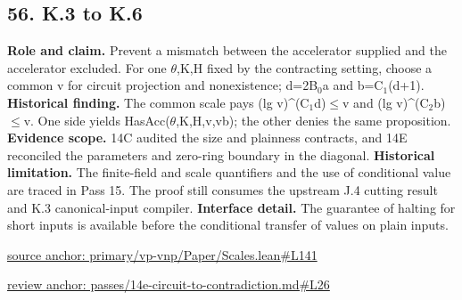\documentclass[11pt,letterpaper]{article}
\theoremstyle{definition}\newtheorem{definition}[theorem]{Definition}\newtheorem{example}[theorem]{Example}
\theoremstyle{remark}\newtheorem{remark}[theorem]{Remark}
\begin{document}
\subsection*{56. K.3 to K.6}
\textbf{Role and claim.} Prevent a mismatch between the accelerator supplied and the accelerator excluded. For one \ensuremath{\theta},K,H fixed by the contracting setting, choose a common v for circuit projection and nonexistence; d=2B\ensuremath{{}_0}a and b=C\ensuremath{{}_1}(d+1).
\textbf{Historical finding.} The common scale pays (lg v)\textasciicircum{}(C\ensuremath{{}_1}d)\ensuremath{\le}v and (lg v)\textasciicircum{}(C\ensuremath{{}_2}b)\ensuremath{\le}v. One side yields HasAcc(\ensuremath{\theta},K,H,v,vb); the other denies the same proposition.
\textbf{Evidence scope.} 14C audited the size and plainness contracts, and 14E reconciled the parameters and zero-ring boundary in the diagonal.
\textbf{Historical limitation.} The finite-field and scale quantifiers and the use of conditional value are traced in Pass 15. The proof still consumes the upstream J.4 cutting result and K.3 canonical-input compiler.
\textbf{Interface detail.} The guarantee of halting for short inputs is available before the conditional transfer of values on plain inputs.
\par\href{https://github.com/nousentllc/VP-VNP-Review/blob/8a7976933b6b2b4ffda1ad3a0dfb5fc6b6f023e8/primary/vp-vnp/Paper/Scales.lean\#L141}{source anchor: primary/vp-vnp/Paper/Scales.lean\#L141}
\par\href{https://github.com/nousentllc/VP-VNP-Review/blob/8a7976933b6b2b4ffda1ad3a0dfb5fc6b6f023e8/passes/14e-circuit-to-contradiction.md\#L26}{review anchor: passes/14e-circuit-to-contradiction.md\#L26}
\goodbreak
{}
\hypertarget{claim.57}{}
\end{document}
